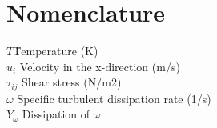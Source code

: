 \section*{Nomenclature}

\begin{tabbing}
$T$\qquad \= Temperature (K)\\
$u_i$ \> Velocity in the x-direction (m/s)\\
$\tau_{ij}$ \> Shear stress (N/m2)\\
$\omega$ \> Specific turbulent dissipation rate (1/s)\\
$Y_\omega$ \> Dissipation of $\omega$
\end{tabbing}




